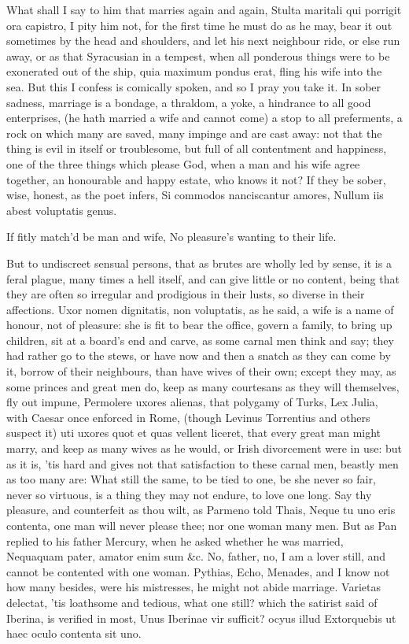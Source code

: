 {What shall I say to him that marries again and again, Stulta
maritali qui porrigit ora capistro, I pity him not, for the first time
he must do as he may, bear it out sometimes by the head and shoulders,
and let his next neighbour ride, or else run away, or as that
Syracusian in a tempest, when all ponderous things were to be
exonerated out of the ship, quia maximum pondus erat, fling his wife
into the sea. But this I confess is comically spoken, and so I
pray you take it. In sober sadness, marriage is a bondage, a
thraldom, a yoke, a hindrance to all good enterprises, (he hath married
a wife and cannot come) a stop to all preferments, a rock on which many
are saved, many impinge and are cast away: not that the thing is evil
in itself or troublesome, but full of all contentment and happiness,
one of the three things which please God,  when a man and his
wife agree together, an honourable and happy estate, who knows it not?
If they be sober, wise, honest, as the poet infers,
Si commodos nanciscantur amores,
Nullum iis abest voluptatis genus.

If fitly match'd be man and wife,
No pleasure's wanting to their life.

But to undiscreet sensual persons, that as brutes are wholly led by
sense, it is a feral plague, many times a hell itself, and can give
little or no content, being that they are often so irregular and
prodigious in their lusts, so diverse in their affections. Uxor nomen
dignitatis, non voluptatis, as he said, a wife is a name of
honour, not of pleasure: she is fit to bear the office, govern a
family, to bring up children, sit at a board's end and carve, as some
carnal men think and say; they had rather go to the stews, or have now
and then a snatch as they can come by it, borrow of their neighbours,
than have wives of their own; except they may, as some princes and
great men do, keep as many courtesans as they will themselves, fly out
impune, Permolere uxores alienas, that polygamy of Turks, Lex
Julia, with Caesar once enforced in Rome, (though Levinus Torrentius
and others suspect it) uti uxores quot et quas vellent liceret, that
every great man might marry, and keep as many wives as he would, or
Irish divorcement were in use: but as it is, 'tis hard and gives not
that satisfaction to these carnal men, beastly men as too many are:
What still the same, to be tied to one, be she never so
fair, never so virtuous, is a thing they may not endure, to love one
long. Say thy pleasure, and counterfeit as thou wilt, as Parmeno
told Thais, Neque tu uno eris contenta, one man will never please thee;
nor one woman many men. But as Pan replied to his father Mercury,
when he asked whether he was married, Nequaquam pater, amator enim sum
\&c. No, father, no, I am a lover still, and cannot be contented with
one woman. Pythias, Echo, Menades, and I know not how many besides,
were his mistresses, he might not abide marriage. Varietas delectat,
'tis loathsome and tedious, what one still? which the satirist said of
Iberina, is verified in most,
Unus Iberinae vir sufficit? ocyus illud
Extorquebis ut haec oculo contenta sit uno.

}
